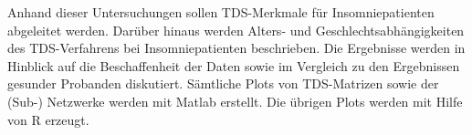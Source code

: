 Anhand dieser Untersuchungen sollen \acs{TDS}-Merkmale für Insomniepatienten abgeleitet werden. Darüber hinaus werden Alters- und Geschlechtsabhängigkeiten des \acs{TDS}-Verfahrens bei Insomniepatienten beschrieben. Die Ergebnisse werden in Hinblick auf die Beschaffenheit der Daten sowie im Vergleich zu den Ergebnissen gesunder Probanden diskutiert. Sämtliche Plots von \acs{TDS}-Matrizen sowie der (Sub-) Netzwerke werden mit Matlab erstellt. Die übrigen Plots werden mit Hilfe von R erzeugt.


